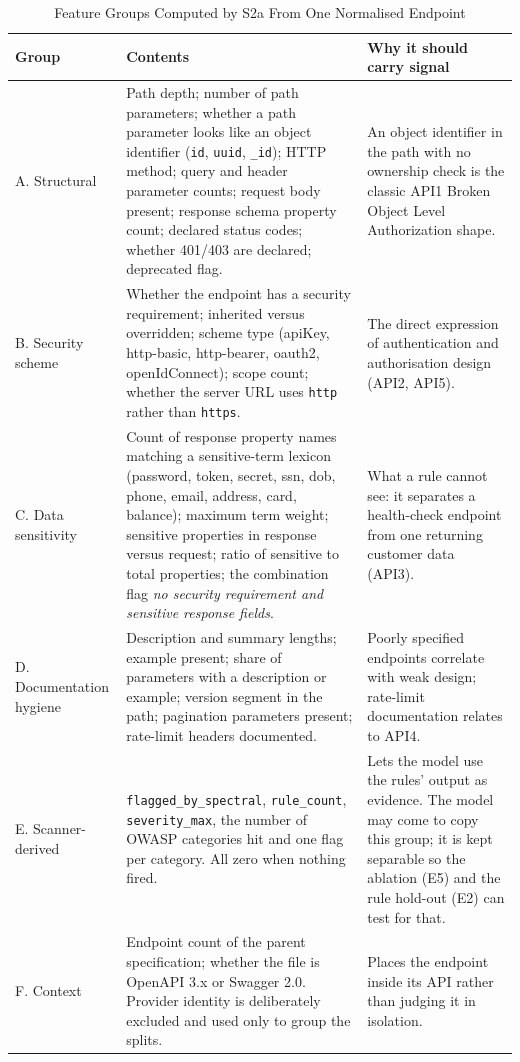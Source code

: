 \documentclass[conference]{IEEEtran}
\begin{document}
\begin{table}[!t]
\caption{Feature Groups Computed by S2a From One Normalised Endpoint}
\label{tab:features}
\centering
\footnotesize
\begin{tabularx}{\textwidth}{L{2.2cm} Y L{4.6cm}}
\toprule
\textbf{Group} & \textbf{Contents} & \textbf{Why it should carry signal}\\
\midrule
A. Structural & Path depth; number of path parameters; whether a path parameter looks like an
object identifier (\texttt{id}, \texttt{uuid}, \texttt{\_id}); HTTP method; query and header
parameter counts; request body present; response schema property count; declared status
codes; whether 401/403 are declared; deprecated flag. & An object identifier in the path with
no ownership check is the classic API1 Broken Object Level Authorization shape.\\
B. Security scheme & Whether the endpoint has a security requirement; inherited versus
overridden; scheme type (apiKey, http-basic, http-bearer, oauth2, openIdConnect); scope
count; whether the server URL uses \texttt{http} rather than \texttt{https}. & The direct
expression of authentication and authorisation design (API2, API5).\\
C. Data sensitivity & Count of response property names matching a sensitive-term lexicon
(password, token, secret, ssn, dob, phone, email, address, card, balance); maximum term
weight; sensitive properties in response versus request; ratio of sensitive to total
properties; the combination flag \emph{no security requirement and sensitive response
fields}. & What a rule cannot see: it separates a health-check endpoint from one returning
customer data (API3).\\
D. Documentation hygiene & Description and summary lengths; example present; share of
parameters with a description or example; version segment in the path; pagination parameters present; rate-limit headers
documented. & Poorly specified endpoints correlate with weak design; rate-limit documentation
relates to API4.\\
E. Scanner-derived & \texttt{flagged\_by\_spectral}, \texttt{rule\_count},
\texttt{severity\_max}, the number of OWASP categories hit and one flag per category. All zero when nothing fired. & Lets the model use the rules' output as evidence. The model may come to copy this group; it is kept separable so the ablation (E5) and the rule hold-out (E2) can test for that.\\
F. Context & Endpoint count of the parent specification; whether the file is OpenAPI 3.x
or Swagger 2.0. Provider identity is deliberately excluded and used only to group the splits. & Places the endpoint inside its API rather than judging it in
isolation.\\
\bottomrule
\end{tabularx}
\end{table}
\end{document}
